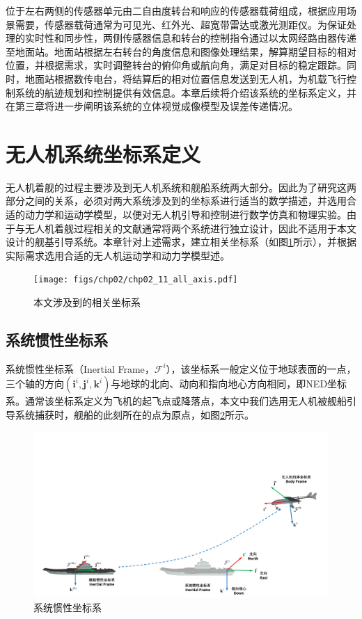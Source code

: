 位于左右两侧的传感器单元由二自由度转台和响应的传感器载荷组成，根据应用场景需要，传感器载荷通常为可见光、红外光、超宽带雷达或激光测距仪。为保证处理的实时性和同步性，两侧传感器信息和转台的控制指令通过以太网经路由器传递至地面站。地面站根据左右转台的角度信息和图像处理结果，解算期望目标的相对位置，并根据需求，实时调整转台的俯仰角或航向角，满足对目标的稳定跟踪。同时，地面站根据数传电台，将结算后的相对位置信息发送到无人机，为机载飞行控制系统的航迹规划和控制提供有效信息。本章后续将介绍该系统的坐标系定义，并在第三章将进一步阐明该系统的立体视觉成像模型及误差传递情况。


\section{无人机系统坐标系定义}
无人机着舰的过程主要涉及到无人机系统和舰船系统两大部分。因此为了研究这两部分之间的关系，必须对两大系统涉及到的坐标系进行适当的数学描述，并选用合适的动力学和运动学模型，以便对无人机引导和控制进行数学仿真和物理实验。由于与无人机着舰过程相关的文献通常将两个系统进行独立设计，因此不适用于本文设计的舰基引导系统。本章针对上述需求，建立相关坐标系（如图\ref{fig:chp02_11_all_axis}所示），并根据实际需求选用合适的无人机运动学和动力学模型述\cite{beardsmall}。
\begin{figure}[!t]   
	\centering
	\texttt{[image: figs/chp02/chp02\_11\_all\_axis.pdf]}
	\caption{本文涉及到的相关坐标系}
	\label{fig:chp02_11_all_axis}
\end{figure}



\subsection{系统惯性坐标系}
系统惯性坐标系（Inertial Frame，$\mathcal{F}^i$），该坐标系一般定义位于地球表面的一点，三个轴的方向$(\mathbf{i}^i, \mathbf{j}^i,\mathbf{k}^i)$与地球的北向、动向和指向地心方向相同，即NED坐标系。通常该坐标系定义为飞机的起飞点或降落点，本文中我们选用无人机被舰船引导系统捕获时，舰船的此刻所在的点为原点，如图\ref{fig:chp02_01_sys_interial_frame}所示。
\begin{figure}[htb]   
	\centering
	\includegraphics[width=\textwidth]{figs/chp02/chp02_01_sys_interial_frame.pdf}
	\caption{系统惯性坐标系}
	\label{fig:chp02_01_sys_interial_frame}
\end{figure}

